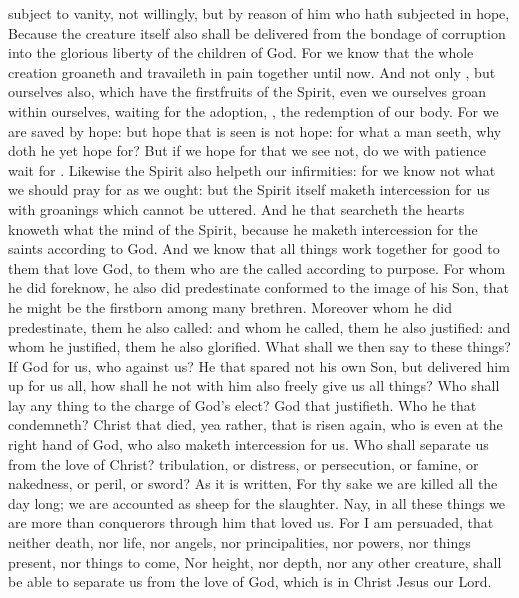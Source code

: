 {subject to
vanity,
not
willingly,
but by reason
of him who hath
subjected
{}
in
hope,
Because the
creature
itself
also shall be
delivered
from the
bondage of
corruption
into the
glorious
liberty of the
children of
God.
For we
know
that the
whole
creation
groaneth
and travaileth in pain
together
until
now.
And
not
only
{},
but
ourselves
also, which
have the
firstfruits of the
Spirit,
even
we
ourselves
groan
within
ourselves, waiting
for the
adoption,
{}, the
redemption
of
our
body.
For we are
saved by
hope:
but
hope that is
seen
is
not
hope:
for
what a
man
seeth,
why doth
he
yet hope
for?
But
if we hope
for
that we
see
not,
{} do
we
with
patience wait
for
{}.
Likewise the
Spirit
also
helpeth
our
infirmities:
for we
know
not
what we should pray
for
as we
ought:
but the
Spirit
itself maketh
intercession
for
us with
groanings which cannot be
uttered.
And he that
searcheth the
hearts
knoweth
what
{} the
mind of the
Spirit,
because he maketh
intercession
for the
saints according
to
{}
God.
And we
know
that all
things work
together
for
good to them that
love
God, to them who
are the
called according
to
{}
purpose.
For
whom he did
foreknow,
he
also did
predestinate
{} conformed
to the
image
of
his
Son,
that
he might
be the
firstborn
among
many
brethren.
Moreover
whom he did
predestinate,
them he
also
called:
and
whom he
called,
them
he
also
justified:
and
whom he
justified,
them
he
also
glorified.
What shall
we
then
say
to these
things?
If
God
{}
for
us,
who
{}
against
us?
He
that
spared
not his
own
Son,
but
delivered
him
up
for
us
all,
how shall
he
not
with
him
also freely
give
us all
things?
Who shall lay any thing to the
charge
of
God’s
elect?
{}
God that
justifieth.
Who
{} he that
condemneth?
{}
Christ that
died,
yea
rather, that is
risen
again,
who
is
even
at the right
hand of
God,
who
also maketh
intercession
for
us.
Who shall
separate
us
from the
love of
Christ?
{}
tribulation,
or
distress,
or
persecution,
or
famine,
or
nakedness,
or
peril,
or
sword?
As it is
written,
For
thy
sake we are
killed
all the day
long; we are
accounted
as
sheep for the
slaughter.
Nay,
in
all these
things we are more than
conquerors
through him that
loved
us.
For I am
persuaded,
that
neither
death,
nor
life,
nor
angels,
nor
principalities,
nor
powers,
nor things
present,
nor things to
come,
Nor
height,
nor
depth,
nor
any
other
creature, shall be
able to
separate
us
from the
love of
God, which
is
in
Christ
Jesus
our
Lord.

}

